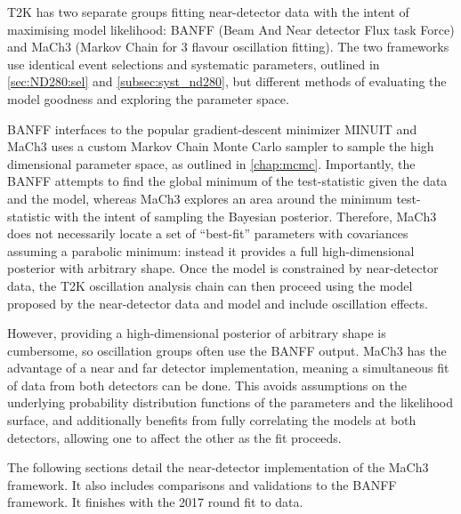 T2K has two separate groups fitting near-detector data with the intent of maximising model likelihood: BANFF (Beam And Near detector Flux task Force) and MaCh3 (Markov Chain for 3 flavour oscillation fitting). The two frameworks use identical event selections and systematic parameters, outlined in \autoref{sec:ND280:sel} and \autoref{subsec:syst_nd280}, but different methods of evaluating the model goodness and exploring the parameter space.

BANFF interfaces to the popular gradient-descent minimizer MINUIT \cite{minuit} and MaCh3 uses a custom Markov Chain Monte Carlo sampler to sample the high dimensional parameter space, as outlined in \autoref{chap:mcmc}. Importantly, the BANFF attempts to find the global minimum of the test-statistic given the data and the model, whereas MaCh3 explores an area around the minimum test-statistic with the intent of sampling the Bayesian posterior. Therefore, MaCh3 does not necessarily locate a set of ``best-fit'' parameters with covariances assuming a parabolic minimum: instead it provides a full high-dimensional posterior with arbitrary shape. Once the model is constrained by near-detector data, the T2K oscillation analysis chain can then proceed using the model proposed by the near-detector data and model and include oscillation effects.

However, providing a high-dimensional posterior of arbitrary shape is cumbersome, so oscillation groups often use the BANFF output. MaCh3 has the advantage of a near and far detector implementation, meaning a simultaneous fit of data from both detectors can be done. This avoids assumptions on the underlying probability distribution functions of the parameters and the likelihood surface, and additionally benefits from fully correlating the models at both detectors, allowing one to affect the other as the fit proceeds.

The following sections detail the near-detector implementation of the MaCh3 framework. It also includes comparisons and validations to the BANFF framework. It finishes with the 2017 round fit to data.
